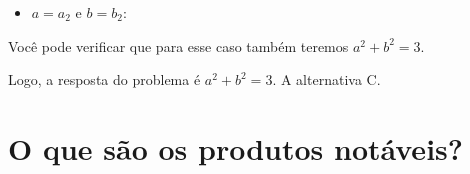 \documentclass[a4paper, 12pt]{article}
\begin{document}
     
     
     
     
     
     
   \begin{itemize}
     
    
     \item   \(a = a_{2}\) e   \(b = b_{2}\): 
     
     
  
 \end{itemize}
 
 \noindent Você pode verificar que para esse caso também teremos \(a^2 + b^2 = 3\).
  
    
 
 
 



\noindent Logo, a resposta do problema é \(a^2 + b^2 = 3\). A alternativa C.


  


%

\section{O que são os produtos notáveis?}
\end{document}
